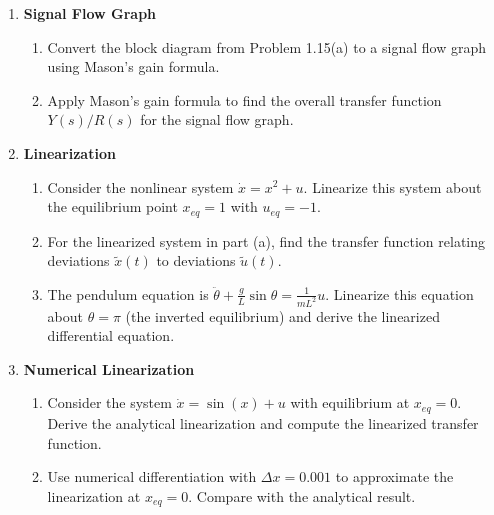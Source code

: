 \begin{enumerate}
\begin{enumerate}
\item For a system with forward path transfer function $G(s) = 10/(s+2)(s+5)$ and feedback path transfer function $H(s) = 0.5s$, determine the closed-loop transfer function.

\item Determine the poles and zeros of the closed-loop system in part (b). Is the system stable?

\end{enumerate}

\item \textbf{Signal Flow Graph}
\begin{enumerate}
\item Convert the block diagram from Problem 1.15(a) to a signal flow graph using Mason's gain formula.

\item Apply Mason's gain formula to find the overall transfer function $Y(s)/R(s)$ for the signal flow graph.

\end{enumerate}

\item \textbf{Linearization}
\begin{enumerate}
\item Consider the nonlinear system $\dot{x} = x^2 + u$. Linearize this system about the equilibrium point $x_{eq} = 1$ with $u_{eq} = -1$.

\item For the linearized system in part (a), find the transfer function relating deviations $\tilde{x}(t)$ to deviations $\tilde{u}(t)$.

\item The pendulum equation is $\ddot{\theta} + \frac{g}{L}\sin\theta = \frac{1}{mL^2}u$. Linearize this equation about $\theta = \pi$ (the inverted equilibrium) and derive the linearized differential equation.

\end{enumerate}

\item \textbf{Numerical Linearization}
\begin{enumerate}
\item Consider the system $\dot{x} = \sin(x) + u$ with equilibrium at $x_{eq} = 0$. Derive the analytical linearization and compute the linearized transfer function.

\item Use numerical differentiation with $\Delta x = 0.001$ to approximate the linearization at $x_{eq} = 0$. Compare with the analytical result.


\end{enumerate}
\end{enumerate}
